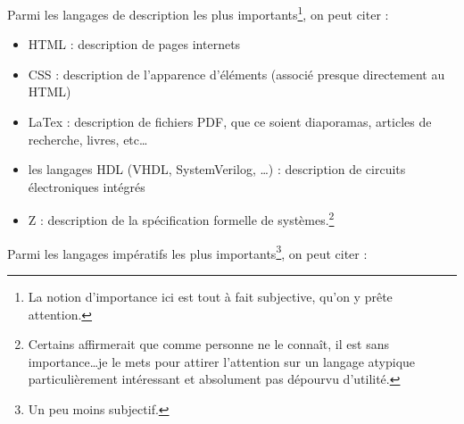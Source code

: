 \documentclass[../../main.tex]{subfiles}
\begin{document}
Parmi les langages de description les plus importants\footnote{La notion d'importance ici est tout à fait subjective, qu'on y prête attention.}, on peut citer :
\begin{itemize}
	\item HTML : description de pages internets
	\item CSS : description de l'apparence d'éléments (associé presque directement au HTML)
	\item LaTex : description de fichiers PDF, que ce soient diaporamas, articles de recherche, livres, etc\dots
	\item les langages HDL (VHDL, SystemVerilog, \dots) : description de circuits électroniques intégrés
	\item Z : description de la spécification formelle de systèmes.\footnote{Certains affirmerait que comme personne ne le connaît, il est sans importance\dots je le mets pour attirer l'attention sur un langage atypique particulièrement intéressant et absolument pas dépourvu d'utilité.}
\end{itemize}
Parmi les langages impératifs les plus importants\footnote{Un peu moins subjectif.}, on peut citer :
\end{document}
